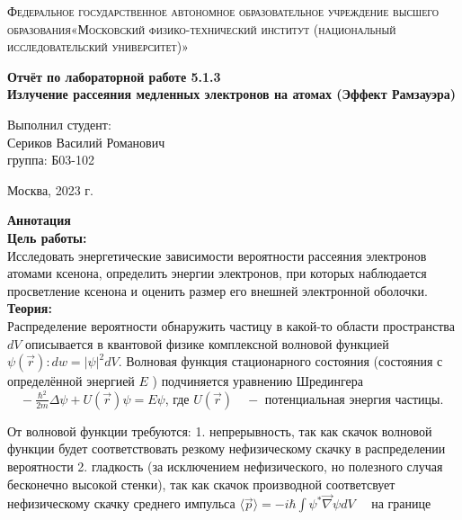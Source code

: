 \documentclass[a4paper, 12pt]{article}%
\begin{document}
	\begin{titlepage}
		\begin{center}
			\textsc{Федеральное государственное автономное образовательное учреждение высшего образования«Московский физико-технический институт (национальный исследовательский университет)»\\[5mm]
			}
			
			\vfill
			
			\textbf{Отчёт по лабораторной работе 5.1.3\\[3mm]
				Излучение рассеяния медленных электронов на атомах (Эффект Рамзауэра)
				\\[50mm]
			}
			
		\end{center}
		
		\hfill
		\begin{minipage}{.5\textwidth}
			Выполнил студент:\\[2mm]
			Сериков Василий Романович\\[2mm]
			группа: Б03-102\\[5mm]
			
		\end{minipage}
		\vfill
		\begin{center}
			Москва, 2023 г.
		\end{center}
		
	\end{titlepage}
	
	\newpage
	\setcounter{page}{2}
	\textbf{Аннотация}\\
	
	\textbf{Цель работы: }\\
	
	Исследовать энергетические зависимости вероятности рассеяния электронов атомами ксенона, определить энергии электронов, при которых наблюдается просветление ксенона и оценить размер его внешней электронной оболочки. \\
	
	\textbf{Теория: }\\
	
	Распределение вероятности обнаружить частицу в какой-то области пространства $d V$ описывается в квантовой физике комплексной волновой функцией $\psi(\vec{r}): d w=|\psi|^2 d V$. Волновая функция стационарного состояния (состояния с определённой энергией $E$ ) подчиняется уравнению Шредингера $\quad-\frac{\hbar^2}{2 m} \Delta \psi+U(\vec{r}) \psi=E \psi$, где $U(\vec{r}) \quad-$ потенциальная энергия частицы.
	
	От волновой функции требуются:
	1. непрерывность, так как скачок волновой функции будет соответствовать резкому нефизическому скачку в распределении вероятности
	2. гладкость (за исключением нефизического, но полезного случая бесконечно высокой стенки), так как скачок производной соответсвует нефизическому скачку среднего импульса $\langle\vec{p}\rangle=-i \hbar \int \psi^* \vec{\nabla} \psi d V \quad$ на границе
	
\end{document}
